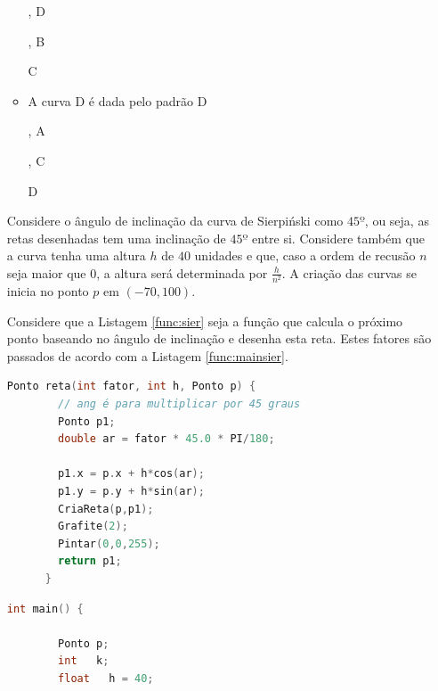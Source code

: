 \begin{enumerate}
\begin{itemize}
      , D
      , B
      C
    \item
      A curva D é dada pelo padrão D
      , A
      , C
      D
  \end{itemize}
  Considere o ângulo de inclinação da curva de Sierpiński como $45º$, ou seja, as retas desenhadas tem uma inclinação de $45º$ entre si. Considere também que a curva tenha uma altura $h$ de $40$ unidades e que, caso a ordem de recusão $n$ seja maior que $0$, a altura será determinada por $\frac{h}{n^{2}}$. A criação das curvas se inicia no ponto $p$ em $(-70, 100)$. 

  Considere que a Listagem \ref{func:sier} seja a função que calcula o próximo ponto baseando no ângulo de inclinação e desenha esta reta. Estes fatores são passados de acordo com a Listagem \ref{func:mainsier}.
  \label{ex:cap04_ex4}

  \begin{lstlisting}[caption=Criação da Curva de Sierpiński, label={func:sier}, language=C++]
      Ponto reta(int fator, int h, Ponto p) {
        // ang é para multiplicar por 45 graus
        Ponto p1;
        double ar = fator * 45.0 * PI/180;

        p1.x = p.x + h*cos(ar);
        p1.y = p.y + h*sin(ar);
        CriaReta(p,p1);
        Grafite(2);
        Pintar(0,0,255);
        return p1;
      }
      \end{lstlisting}

    \begin{lstlisting}[caption=Função main Curva de Sierpiński, label={func:mainsier}, language=C++]
      int main() {

        Ponto p;
        int   k; 
        float   h = 40;


\end{lstlisting}
\end{enumerate}
